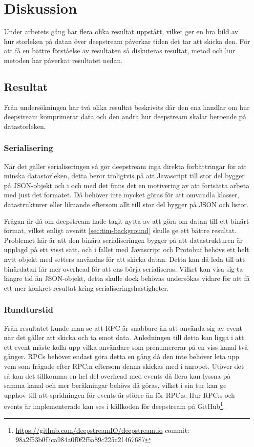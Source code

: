 \section{Diskussion}
\label{sec:tim-discussion}
Under arbetets gång har flera olika resultat uppstått, vilket ger en bra bild av hur storleken på datan över deepstream påverkar tiden det tar att skicka den. För att få en bättre förståelse av resultaten så diskuteras resultat, metod och hur metoden har påverkat resultatet nedan. 

\subsection{Resultat}
\label{subsec:tim-discussion-results}
Från undersökningen har två olika resultat beskrivits där den ena handlar om hur deepstream komprimerar data och den andra hur deepstream skalar beroende på datastorleken.

\subsubsection{Serialisering}
När det gäller serialiseringen så gör deepstream inga direkta förbättringar för att minska datastorleken, detta beror troligtvis på att Javascript till stor del bygger på JSON-objekt och i och med det finns det en motivering av att fortsätta arbeta med just det formatet. Då behöver inte mycket göras för att omvandla klasser, datastrukturer eller liknande eftersom allt till stor del bygger på JSON och listor.

Frågan är då om deepstream hade tagit nytta av att göra om datan till ett binärt format, vilket enligt avsnitt \ref{sec:tim-background} skulle ge ett bättre resultat. Problemet här är att den binära serialiseringen bygger på att datastrukturen är upplagd på ett visst sätt, och i fallet med Javascript och Protobuf behövs ett helt nytt objekt med setters användas för att skicka datan. Detta kan då leda till att binärdatan får mer overhead för att ens börja serialiseras. Vilket kan visa sig ta längre tid än JSON-objekt, detta skulle dock behövas undersökas vidare för att få ett mer konkret resultat kring serialiseringshastigheter.

\subsubsection{Rundturstid}
Från resultatet kunde man se att RPC är snabbare än att använda sig av event när det gäller att skicka och ta emot data. Anledningen till detta kan ligga i att ett event måste kolla upp vilka användare som prenumererar på en viss kanal två gånger. RPCs behöver endast göra detta en gång då den inte behöver leta upp vem som frågade efter RPC:n eftersom denna skickas med i anropet. Utöver det så kan det tillkomma en hel del overhead med events då flera kan lyssna på samma kanal och mer beräkningar behövs då göras, vilket i sin tur kan ge upphov till att spridningen för events är större än för RPC:s. Hur RPC:s och events är implementerade kan ses i källkoden för deepstream på GitHub\footnote{\url{https://github.com/deepstreamIO/deepstream.io} \newline commit: 98a2f53b0f7ca984a0f0f2f5a89c225c21467687}. 

